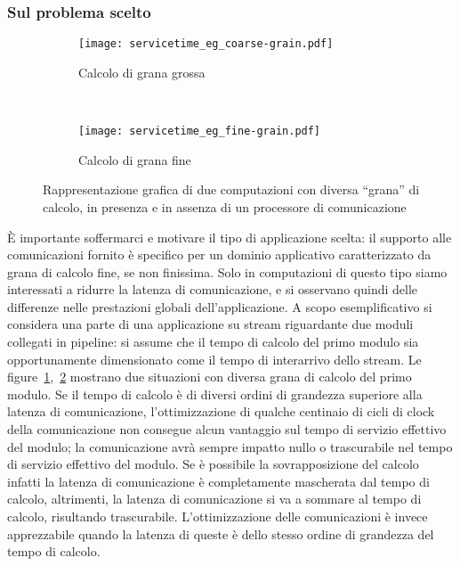 \subsubsection{Sul problema scelto}
\begin{figure}[!t]
  \begin{subfigure}[b]{.5\textwidth}
    \texttt{[image: servicetime\_eg\_coarse-grain.pdf]}
    \caption{Calcolo di grana grossa}
    \label{fig:eg_coarse_grain}
  \end{subfigure}
  ~
  \begin{subfigure}[b]{.5\textwidth}
    \texttt{[image: servicetime\_eg\_fine-grain.pdf]}
    \caption{Calcolo di grana fine}
    \label{fig:eg_fine_grain}
  \end{subfigure}
  \caption[Esempio di due computazioni su stream con diversa grana]{Rappresentazione grafica di due computazioni con diversa ``grana'' di calcolo, in presenza e in assenza di un processore di comunicazione}
  \label{fig:eg_grain}
\end{figure}
\`E importante soffermarci e motivare il tipo di applicazione scelta: il supporto alle comunicazioni fornito \`e specifico per un dominio applicativo caratterizzato da grana di calcolo fine, se non finissima. Solo in computazioni di questo tipo siamo interessati a ridurre la latenza di comunicazione, e si osservano quindi delle differenze nelle prestazioni globali dell'applicazione. A scopo esemplificativo si considera una parte di una applicazione su stream riguardante due moduli collegati in pipeline: si assume che il tempo di calcolo del primo modulo sia opportunamente dimensionato come il tempo di interarrivo dello stream. Le figure~\ref{fig:eg_coarse_grain},~\ref{fig:eg_fine_grain} mostrano due situazioni con diversa grana di calcolo del primo modulo. Se il tempo di calcolo \`e di diversi ordini di grandezza superiore alla latenza di comunicazione, l'ottimizzazione di qualche centinaio di cicli di clock della comunicazione non consegue alcun vantaggio sul tempo di servizio effettivo del modulo; la comunicazione avr\`a sempre impatto nullo o trascurabile nel tempo di servizio effettivo del modulo. Se \`e possibile la sovrapposizione del calcolo infatti la latenza di comunicazione \`e completamente mascherata dal tempo di calcolo, altrimenti, la latenza di comunicazione si va a sommare al tempo di calcolo, risultando trascurabile. L'ottimizzazione delle comunicazioni \`e invece apprezzabile quando la latenza di queste \`e dello stesso ordine di grandezza del tempo di calcolo. 

